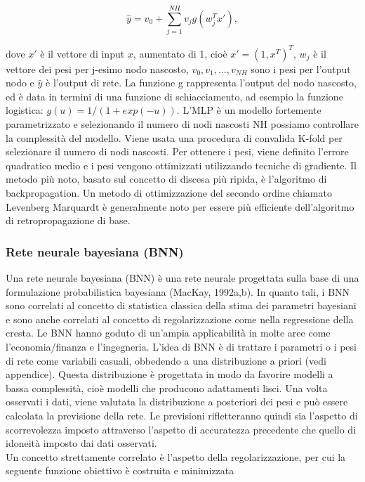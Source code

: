 \documentclass[12pt,a4paper]{report}
\begin{document}
\begin{equation}
{\displaystyle \hat{y} = v_0 + \sum\limits_{j=1}^{NH} v_jg(w_{j}^{T}x')} ,
\end{equation}

dove $x'$ è il vettore di input $x$, aumentato di 1, cioè $ x' = (1, x^T )^T  $, $w_j$  è il vettore dei pesi per j-esimo nodo nascosto, $v_0, v_1, ..., v_{NH}$ sono i pesi per l'output nodo e $\hat{y}$ è l'output di rete. La funzione g rappresenta l'output del nodo nascosto, ed è data in termini di una funzione di schiacciamento, ad esempio la funzione logistica:
$g(u) = 1/(1 + exp(-u))$. 
L'MLP è un modello fortemente parametrizzato e selezionando il numero di nodi nascosti NH possiamo controllare la complessità del modello. Viene usata una procedura di convalida K-fold per selezionare il numero di nodi nascosti.
Per ottenere i pesi, viene definito l'errore quadratico medio e i pesi vengono ottimizzati utilizzando tecniche di gradiente. Il metodo più noto, basato sul concetto di discesa più ripida, è l'algoritmo di backpropagation. Un metodo di ottimizzazione del secondo ordine chiamato Levenberg Marquardt è generalmente noto per essere più efficiente dell'algoritmo di retropropagazione di base.


\subsubsection{Rete neurale bayesiana (BNN)}
Una rete neurale bayesiana (BNN) è una rete neurale progettata sulla base di una formulazione probabilistica bayesiana (MacKay, 1992a,b). In quanto tali, i BNN sono correlati al concetto di statistica classica della stima dei parametri bayesiani e sono anche correlati al concetto di regolarizzazione come nella regressione della cresta. Le BNN hanno goduto di un'ampia applicabilità in molte aree come l'economia/finanza e l'ingegneria. L'idea di BNN è di trattare i parametri o i pesi di rete come variabili casuali, obbedendo a una distribuzione a priori (vedi appendice). Questa distribuzione è progettata in modo da favorire modelli a bassa complessità, cioè modelli che producono adattamenti lisci. Una volta osservati i dati, viene valutata la distribuzione a posteriori dei pesi e può essere calcolata la previsione della rete. Le previsioni rifletteranno quindi sia l'aspetto di scorrevolezza imposto attraverso l'aspetto di accuratezza precedente che quello di idoneità imposto dai dati osservati.\\
Un concetto strettamente correlato è l'aspetto della regolarizzazione, per cui la seguente funzione obiettivo è costruita e minimizzata
\end{document}
